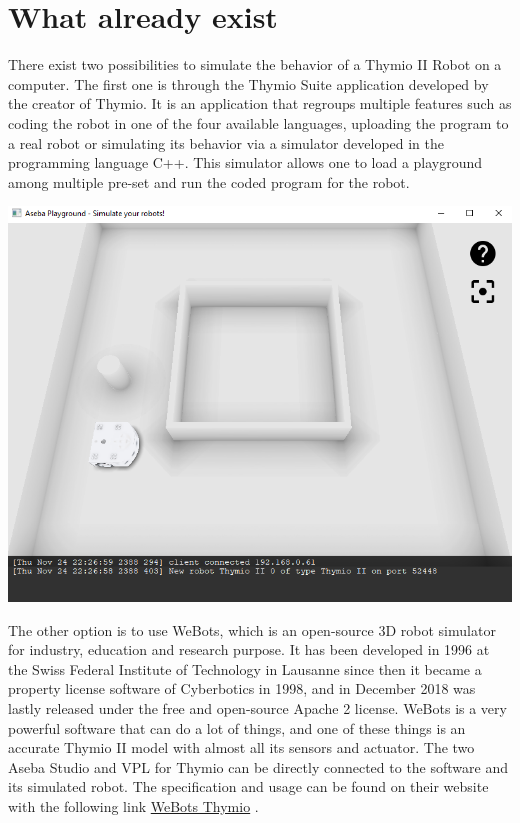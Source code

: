 \documentclass{scrartcl}
\begin{document}
\section{What already exist} 

There exist two possibilities to simulate the behavior of a Thymio II Robot on a computer. 
The first one is through the Thymio Suite application developed by the creator of Thymio. 
It is an application that regroups multiple features such as coding the robot in one of the four available languages, 
uploading the program to a real robot or simulating its behavior via a simulator developed in the programming language C++. 
This simulator allows one to load a playground among multiple pre-set and run the coded program for the robot.

\begin{center}
  \includegraphics[width=\textwidth]{./suite_simulator}
\end{center}

The other option is to use WeBots, which is an open-source 3D robot simulator for industry, education and research purpose. 
It has been developed in 1996 at the Swiss Federal Institute of Technology in Lausanne since then it became a property license software of Cyberbotics in 1998, 
and in December 2018 was lastly released under the free and open-source Apache 2 license.
WeBots is a very powerful software that can do a lot of things, and one of these things is an accurate Thymio II model with almost all its sensors and actuator. 
The two Aseba Studio and VPL for Thymio can be directly connected to the software and its simulated robot. 
The specification and usage can be found on their website with the following link \href{https://www.cyberbotics.com/doc/guide/thymio2#mosybas-thymio-ii}{WeBots Thymio} .
\end{document}
